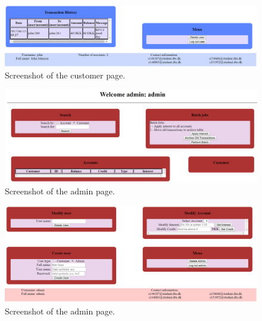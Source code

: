 \begin{figure}[H]
\centering
\includegraphics[width = 1.0\textwidth]{figures/customerPage2.png}
\caption{Screenshot of the customer page.}
\label{fig:customerPage2}
\end{figure}

\begin{figure}[H]
\centering
\includegraphics[width = 1.0\textwidth]{figures/adminPage1.png}
\caption{Screenshot of the admin page.}
\label{fig:adminPage1}
\end{figure}

\begin{figure}[H]
\centering
\includegraphics[width = 1.0\textwidth]{figures/adminPage2.png}
\caption{Screenshot of the admin page.}
\label{fig:adminPage2}
\end{figure}
